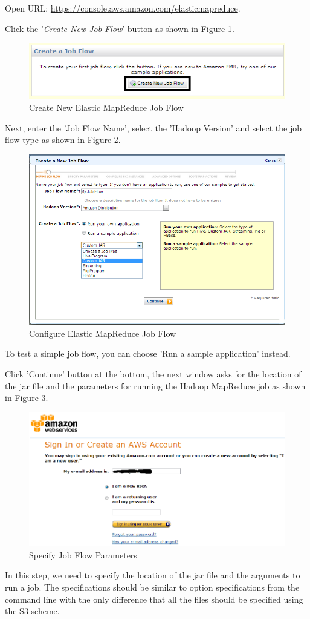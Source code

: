 Open URL: \url{https://console.aws.amazon.com/elasticmapreduce}.

Click the '\emph{Create New Job Flow}' button as shown in Figure \ref{fig:aws.elasticmapred.createflow}.
\begin{figure}[ht]
  \centering
  \includegraphics[width=.7\textwidth]{figs/5163os_08_23.png}
  \caption{Create New Elastic MapReduce Job Flow}\label{fig:aws.elasticmapred.createflow}
\end{figure} 
Next, enter the 'Job Flow Name', select the 'Hadoop Version' and select the job flow type as shown in Figure \ref{fig:aws.elasticmapred.config}.
\begin{figure}[ht]
  \centering
  \includegraphics[width=.8\textwidth]{figs/5163os_08_24.png}
  \caption{Configure Elastic MapReduce Job Flow}\label{fig:aws.elasticmapred.config}
\end{figure} 
To test a simple job flow, you can choose 'Run a sample application' instead.

Click 'Continue' button at the bottom, the next window asks for the location of the jar file and the parameters for running the Hadoop MapReduce job as shown in Figure \ref{fig:aws.elasticmapred.specify.param}.
\begin{figure}[ht]
  \centering
  \includegraphics[width=.8\textwidth]{figs/5163os_08_01.png}
  \caption{Specify Job Flow Parameters}\label{fig:aws.elasticmapred.specify.param}
\end{figure} 
In this step, we need to specify the location of the jar file and the arguments to run a job. The specifications should be similar to option specifications from the command line with the only difference that all the files should be specified using the S3 scheme.

